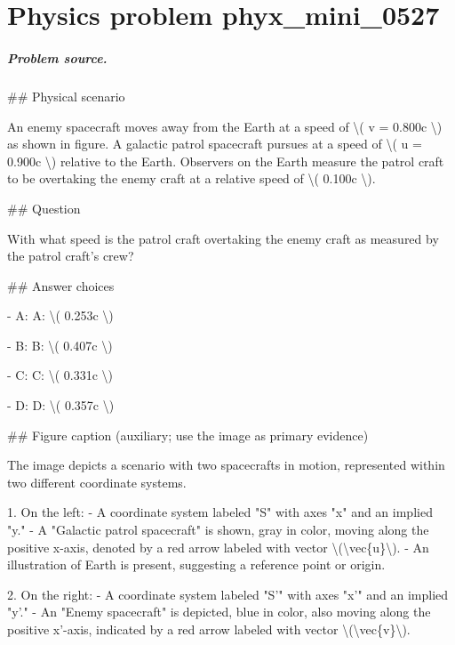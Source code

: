 
\chapter{Physics problem phyx\_mini\_0527}
\label{ch:PhyXMiniProblems_problem_phyx_mini_0527}

\paragraph{Problem source.}
\#\# Physical scenario

An enemy spacecraft moves away from the Earth at a speed of \textbackslash{}( v = 0.800c \textbackslash{}) as shown in figure. A galactic patrol spacecraft pursues at a speed of \textbackslash{}( u = 0.900c \textbackslash{}) relative to the Earth. Observers on the Earth measure the patrol craft to be overtaking the enemy craft at a relative speed of \textbackslash{}( 0.100c \textbackslash{}).

\#\# Question

With what speed is the patrol craft overtaking the enemy craft as measured by the patrol craft's crew?

\#\# Answer choices

- A: A: \textbackslash{}( 0.253c \textbackslash{})

- B: B: \textbackslash{}( 0.407c \textbackslash{})

- C: C: \textbackslash{}( 0.331c \textbackslash{})

- D: D: \textbackslash{}( 0.357c \textbackslash{})

\#\# Figure caption (auxiliary; use the image as primary evidence)

The image depicts a scenario with two spacecrafts in motion, represented within two different coordinate systems.

1. On the left:
   - A coordinate system labeled "S" with axes "x" and an implied "y."
   - A "Galactic patrol spacecraft" is shown, gray in color, moving along the positive x-axis, denoted by a red arrow labeled with vector \textbackslash{}(\textbackslash{}vec\{u\}\textbackslash{}).
   - An illustration of Earth is present, suggesting a reference point or origin.

2. On the right:
   - A coordinate system labeled "S'" with axes "x'" and an implied "y'." 
   - An "Enemy spacecraft" is depicted, blue in color, also moving along the positive x'-axis, indicated by a red arrow labeled with vector \textbackslash{}(\textbackslash{}vec\{v\}\textbackslash{}).

